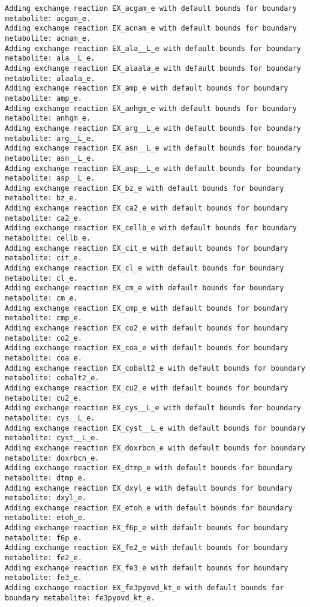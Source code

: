 \documentclass[
  letterpaper,
  DIV=11,
  numbers=noendperiod]{scrartcl}
\begin{document}
\begin{verbatim}
Adding exchange reaction EX_acgam_e with default bounds for boundary metabolite: acgam_e.
Adding exchange reaction EX_acnam_e with default bounds for boundary metabolite: acnam_e.
Adding exchange reaction EX_ala__L_e with default bounds for boundary metabolite: ala__L_e.
Adding exchange reaction EX_alaala_e with default bounds for boundary metabolite: alaala_e.
Adding exchange reaction EX_amp_e with default bounds for boundary metabolite: amp_e.
Adding exchange reaction EX_anhgm_e with default bounds for boundary metabolite: anhgm_e.
Adding exchange reaction EX_arg__L_e with default bounds for boundary metabolite: arg__L_e.
Adding exchange reaction EX_asn__L_e with default bounds for boundary metabolite: asn__L_e.
Adding exchange reaction EX_asp__L_e with default bounds for boundary metabolite: asp__L_e.
Adding exchange reaction EX_bz_e with default bounds for boundary metabolite: bz_e.
Adding exchange reaction EX_ca2_e with default bounds for boundary metabolite: ca2_e.
Adding exchange reaction EX_cellb_e with default bounds for boundary metabolite: cellb_e.
Adding exchange reaction EX_cit_e with default bounds for boundary metabolite: cit_e.
Adding exchange reaction EX_cl_e with default bounds for boundary metabolite: cl_e.
Adding exchange reaction EX_cm_e with default bounds for boundary metabolite: cm_e.
Adding exchange reaction EX_cmp_e with default bounds for boundary metabolite: cmp_e.
Adding exchange reaction EX_co2_e with default bounds for boundary metabolite: co2_e.
Adding exchange reaction EX_coa_e with default bounds for boundary metabolite: coa_e.
Adding exchange reaction EX_cobalt2_e with default bounds for boundary metabolite: cobalt2_e.
Adding exchange reaction EX_cu2_e with default bounds for boundary metabolite: cu2_e.
Adding exchange reaction EX_cys__L_e with default bounds for boundary metabolite: cys__L_e.
Adding exchange reaction EX_cyst__L_e with default bounds for boundary metabolite: cyst__L_e.
Adding exchange reaction EX_doxrbcn_e with default bounds for boundary metabolite: doxrbcn_e.
Adding exchange reaction EX_dtmp_e with default bounds for boundary metabolite: dtmp_e.
Adding exchange reaction EX_dxyl_e with default bounds for boundary metabolite: dxyl_e.
Adding exchange reaction EX_etoh_e with default bounds for boundary metabolite: etoh_e.
Adding exchange reaction EX_f6p_e with default bounds for boundary metabolite: f6p_e.
Adding exchange reaction EX_fe2_e with default bounds for boundary metabolite: fe2_e.
Adding exchange reaction EX_fe3_e with default bounds for boundary metabolite: fe3_e.
Adding exchange reaction EX_fe3pyovd_kt_e with default bounds for boundary metabolite: fe3pyovd_kt_e.

\end{verbatim}
\end{document}
